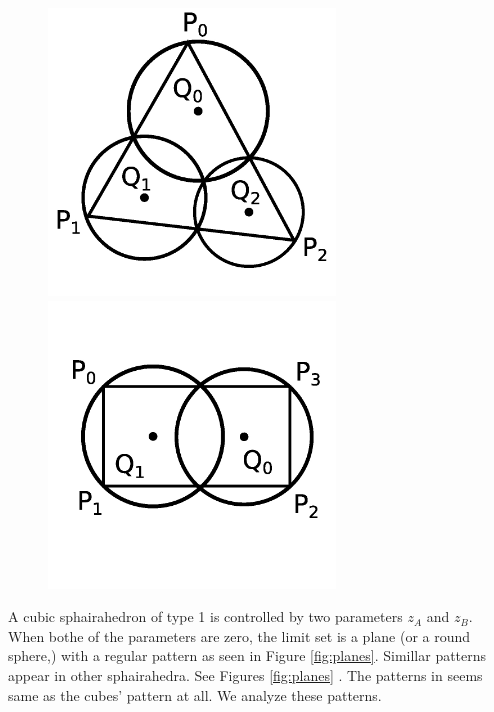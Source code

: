 \documentclass[suppldata, dvipdfmx]{interact}
\theoremstyle{plain}%
\theoremstyle{definition}
\theoremstyle{remark}
\theoremstyle{problemstyle}
\begin{document}
\begin{figure}[h!tbp]
 \begin{minipage}[t]{0.5\textwidth}
 \centering
 \includegraphics[width=3in,
 keepaspectratio]{./img/Observation/triangle.jpg}
 \caption{}
 \label{fig:obsTriangle}
 \end{minipage}
 \hspace*{\fill}
 \begin{minipage}[t]{0.5\textwidth}
  \centering
  \includegraphics[width=3in,
  keepaspectratio]{./img/Observation/rect.jpg}
  \caption{}
  \label{fig:obsRect}
 \end{minipage}
 \hspace*{\fill}
\end{figure}

A cubic sphairahedron of type 1 is controlled by two parameters $z_A$ and $z_B$.
When bothe of the parameters are zero, 
the limit set is a plane (or a round sphere,) with a regular pattern as seen in Figure \ref{fig:planes}.
Simillar patterns appear in other sphairahedra.  
See Figures \ref{fig:planes}
.
The patterns in 
seems same as the cubes' pattern at all.  
We analyze these patterns.
\end{document}
